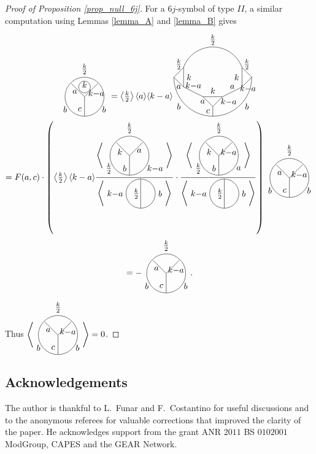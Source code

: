 \documentclass[pdftex]{sigma}
\numberwithin{equation}{section}
\begin{document}
\begin{proof}[Proof of Proposition \ref{prop_null_6j}]
For a $6j$-symbol of type $II$, a similar computation using Lemmas \ref{lemma_A} and \ref{lemma_B} gives
\begin{gather*}
\tikz[scale=0.4,baseline=-0.5ex]{
\draw (0,0) circle (2);
\draw (0,1) circle (0.6);
\draw (0,0)--(0,-2);
\draw (-1.35,1.35)--(0,0);
\draw (1.35,1.35)--(0,0);
\draw (0,2) node[above]{$\frac{k}{2}$};
\draw (-1,1) node[below]{$a$};
\draw (1.2,1) node[below]{$k{-}a$};
\draw (-1.5,-1.3) node[left]{$b$};
\draw (0,-1.3) node[left]{$c$};
\draw (1.5,-1.3) node[right]{$b$};
\draw (0,0.6) node[above]{$k$};
} = \left< \tfrac{k}{2}\right> \langle a \rangle \langle k-a \rangle
\tikz[scale=0.4,baseline=-0.5ex]{
\draw (-1,0)--(1,0);
\draw (-1,0)--(0,-1);
\draw (1,0)--(0,-1);
\draw (-1,0)--(-3,1);
\draw (-3,1)--(-3,3);
\draw (-3,1)--(-4,2);
\draw (-4,2)--(-3,3);
\draw (1,0)--(3,1);
\draw (3,1)--(3,3);
\draw (3,1)--(4,2);
\draw (4,2)--(3,3);
\draw (0,-1)--(0,-2);
\draw (-4,2) arc (-180:0:4);
\draw (3,3) arc (20:160:3.2);
\draw (0, -1.5) node[left]{$c$};
\draw (-3,-1) node[left]{$b$};
\draw (3,-1) node[right]{$b$};
\draw (-0.5,-0.5) node[left]{$a$};
\draw (0.5,-0.5) node[right]{$k{-}a$};
\draw (0,0) node[above]{$k$};
\draw (-2,0.5) node[above]{$k{-}a$};
\draw (2,0.5) node[above]{$a$};
\draw (-3.5, 1.5) node[below]{$a$};
\draw (3.6, 1.5) node[below]{$k{-}a$};
\draw (-3,2) node[right]{$k$};
\draw (3,2) node[left]{$k$};
\draw (3.5,2.5)node[above]{$\frac{k}{2}$};
\draw (-3.5,2.5)node[above]{$\frac{k}{2}$};
\draw (0,5) node[above]{$\frac{k}{2}$};
} \\
=
F (a, c ) \cdot \left(
\left<\tfrac{k}{2} \right>\langle k-a\rangle \frac{\left< \Tetahedrongraph{$\frac{k}{2}$}{$k$}{$a$}{$\frac{k}{2}$}{$b$}{$k{-}a$}\right>}{\left< \thetagraph{$k{-}a$}{$\frac{k}{2}$}{$b$} \right>} \cdot \frac{\left< \Tetahedrongraph{$\frac{k}{2}$}{$k$}{$k{-}a$}{$\frac{k}{2}$}{$b$}{$a$}\right>}{\left< \thetagraph{$k{-}a$}{$\frac{k}{2}$}{$b$} \right>}
\right) \Tetahedrongraph{$\frac{k}{2}$}{$a$}{$k{-}a$}{$b$}{$c$}{$b$}
\\ = -\Tetahedrongraph{$\frac{k}{2}$}{$a$}{$k{-}a$}{$b$}{$c$}{$b$}.
\end{gather*}
Thus $\left< \Tetahedrongraph{$\frac{k}{2}$}{$a$}{$k{-}a$}{$b$}{$c$}{$b$} \right> =0$.
\end{proof}

\subsection*{Acknowledgements}

The author is thankful to L.~Funar and F.~Costantino for useful discussions
and to the anonymous referees for valuable corrections that improved the
clarity of the paper. He acknowledges support from the grant ANR $2011$ BS $01 020 01$ ModGroup, CAPES and the GEAR Network.
\end{document}
